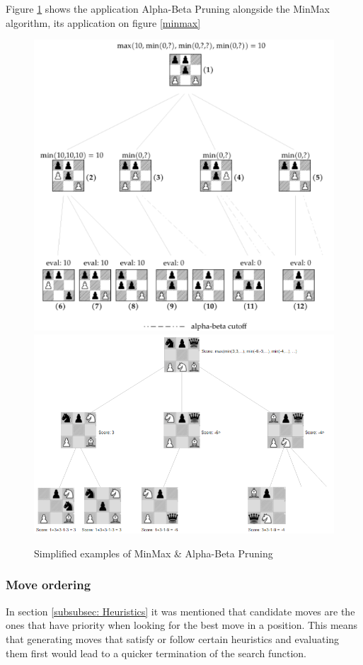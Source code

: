 Figure \ref{minAB} \cite{Klein} shows the application Alpha-Beta Pruning alongside the MinMax algorithm, its application on figure \ref{minmax}

\begin{figure}[h]
    \centering
    \includegraphics[scale=0.45]{images/kleinPruneFig.png}
    \includegraphics[scale=0.40]{images/minMaxpruned.png}
    \caption{Simplified examples of MinMax \& Alpha-Beta Pruning}
    \label{minAB}
\end{figure}


\subsubsection{Move ordering}
In section \ref{subsubsec: Heuristics} it was mentioned that candidate moves are the ones that have priority when looking for the best move in a position. This means that generating moves that satisfy or follow certain heuristics and evaluating them first would lead to a quicker termination of the search function.

